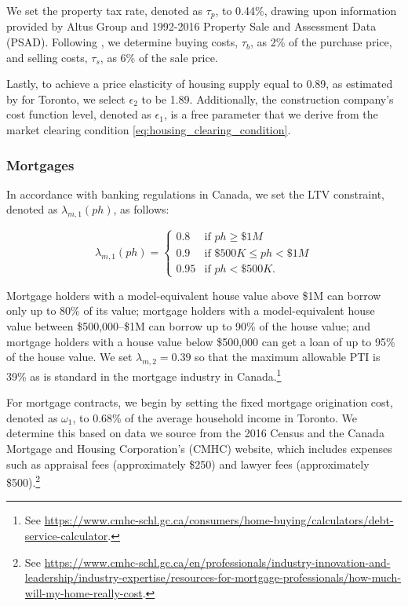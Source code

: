 \documentclass[parskip=full]{article}
\begin{document}
We set the property tax rate, denoted as $\tau_p$, to 0.44\%, drawing upon information provided by Altus Group and 1992-2016 Property Sale and Assessment Data (PSAD). Following \citet{gm-2003}, we determine buying costs, $\tau_{b}$, as 2\% of the purchase price, and selling costs, $\tau_{s}$, as 6\% of the sale price.

Lastly, to achieve a price elasticity of housing supply equal to 0.89, as estimated by \citet{piaxao-2021} for Toronto, we select $\epsilon_{2}$ to be 1.89. Additionally, the construction company's cost function level, denoted as $\epsilon_1$, is a free parameter that we derive from the market clearing condition \eqref{eq:housing_clearing_condition}.


\subsubsection{Mortgages}

In accordance with banking regulations in Canada, we set the LTV constraint, denoted as $\lambda_{m,1}(ph)$, as follows:

\begin{equation*}
\lambda_{m,1}(ph) = \begin{cases}
0.8 &\text{if $ph\geq \$1M$}\\
0.9 &\text{if $\$500K\leq ph< \$1M$}\\
0.95 &\text{if $ph < \$500K$}.
\end{cases}
\end{equation*}

\noindent Mortgage holders with a model-equivalent house value above \$1M can borrow only up to 80\% of its value; mortgage holders with a model-equivalent house value between \$500,000--\$1M can borrow up to 90\% of the house value; and mortgage holders with a house value below \$500,000 can get a loan of up to 95\% of the house value. We set $\lambda_{m,2}=0.39$ so that the maximum allowable PTI is 39\% as is standard in the mortgage industry in Canada.\footnote{See \url{https://www.cmhc-schl.gc.ca/consumers/home-buying/calculators/debt-service-calculator}.}

For mortgage contracts, we begin by setting the fixed mortgage origination cost, denoted as $\omega_{1}$, to 0.68\% of the average household income in Toronto. We determine this based on data we source from the 2016 Census and the Canada Mortgage and Housing Corporation's (CMHC) website, which includes expenses such as appraisal fees (approximately \$250) and lawyer fees (approximately \$500).\footnote{See \url{https://www.cmhc-schl.gc.ca/en/professionals/industry-innovation-and-leadership/industry-expertise/resources-for-mortgage-professionals/how-much-will-my-home-really-cost}.}
\end{document}
